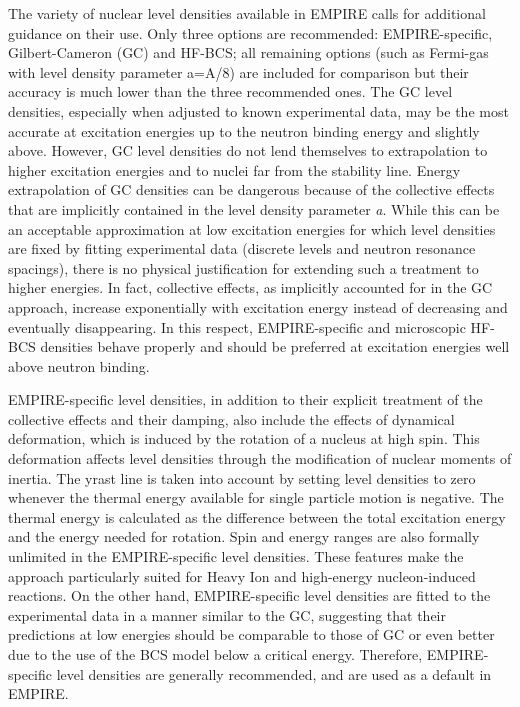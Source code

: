 The variety of nuclear level densities available in EMPIRE calls for
additional guidance on their use. Only three options are recommended:
EMPIRE-specific, Gilbert-Cameron (GC) and HF-BCS; all remaining options
(such as Fermi-gas with level density parameter a=A/8) are included for
comparison but their accuracy is much lower than the three recommended
ones.
The GC level densities, especially when adjusted to known experimental data,
may be the most accurate at excitation energies up to the neutron binding
energy and slightly above.
However, GC level densities do not lend themselves to
extrapolation to higher excitation energies and to nuclei far from the
stability line. Energy extrapolation of GC densities
can be dangerous because of the
collective effects that are implicitly contained in the level density
parameter \textit{a}. While this can be an acceptable approximation at low
excitation energies for which level densities are fixed by fitting
experimental data (discrete levels and neutron resonance spacings), there is
no physical justification for extending such a treatment to higher energies.
In fact, collective effects, as implicitly accounted for in the GC approach,
increase exponentially with excitation energy instead of decreasing and
eventually disappearing. In this respect, EMPIRE-specific and microscopic
HF-BCS densities behave properly and should be preferred at excitation
energies well above neutron binding.

EMPIRE-specific level densities, in addition to their explicit treatment of the
collective effects and their damping, also include the effects of dynamical
deformation, which is induced by the rotation of a nucleus at high spin.
This deformation affects level densities through the modification of nuclear
moments of inertia. The yrast line is taken into account by setting level
densities to zero whenever the thermal energy available for single particle
motion is negative. The thermal energy is calculated as the difference between
the total excitation energy and the energy needed for rotation. Spin and
energy ranges are also formally unlimited in the EMPIRE-specific level
densities. These features make the approach particularly suited for
Heavy Ion and high-energy nucleon-induced reactions. On the other hand,
EMPIRE-specific level densities are fitted to the experimental data in a
manner similar to the GC, suggesting that their predictions at low energies
should be comparable to those of GC or even better due to the use of the BCS
model below a critical energy. Therefore, EMPIRE-specific level densities are
generally recommended, and are used as a default in EMPIRE.

